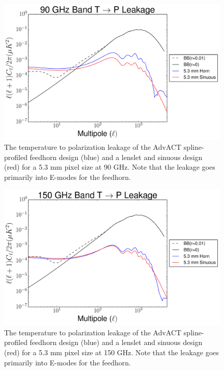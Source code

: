 \begin{figure}[h!]
\centering
\includegraphics[width=\textwidth]{figures/90GHz_band_ITT_pixel_size_horn_sinuous_5p3mm.pdf}
\caption{The temperature to polarization leakage of the AdvACT spline-profiled feedhorn design (blue) and a lenslet and sinuous design (red) for a 5.3 mm pixel size at 90 GHz. Note that the leakage goes primarily into E-modes for the feedhorn.}
\label{fig:MF_90_TP_leakage}
\end{figure}

\begin{figure}[h!]
\centering
\includegraphics[width=\textwidth]{figures/150GHz_band_ITT_pixel_size_horn_sinuous_5p3mm.pdf}
\caption{The temperature to polarization leakage of the AdvACT spline-profiled feedhorn design (blue) and a lenslet and sinuous design (red) for a 5.3 mm pixel size at 150 GHz. Note that the leakage goes primarily into E-modes for the feedhorn.}
\label{fig:MF_150_TP_leakage}
\end{figure}

